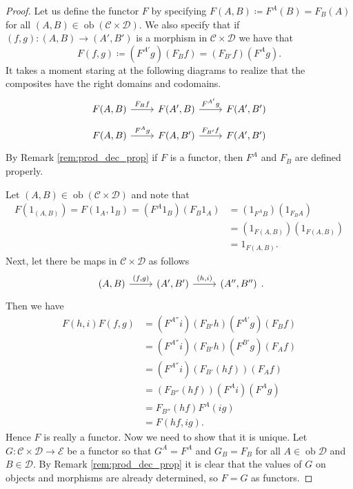 \documentclass{report}
\DeclareMathOperator{\ob}{ob}
\theoremstyle{definition}
\theoremstyle{plain}
\theoremstyle{definition}
\begin{document}
		\begin{proof}
			Let us define the functor $F$ by specifying $F(A,B) \coloneqq F^A(B) = F_B(A)$ for all $(A,B)\in\ob(\mathcal{C}\times\mathcal{D})$. We also specify that if $(f,g)\colon (A,B)\to (A',B')$ is a morphism in $\mathcal{C}\times \mathcal{D}$ we have that 
			\[
				F(f,g) \coloneqq (F^{A'}g)(F_Bf) = (F_{B'}f)(F^Ag).
			\]
			It takes a moment staring at the following diagrams to realize that the composites have the right domains and codomains.
			\[\begin{tikzcd}
				{F(A,B)} & {F(A',B)} & {F(A',B')}
				\arrow["{F_Bf}", from=1-1, to=1-2]
				\arrow["{F^{A'}g}", from=1-2, to=1-3]
			\end{tikzcd}\]
			\[\begin{tikzcd}
				{F(A,B)} & {F(A,B')} & {F(A',B')}
				\arrow["{F^Ag}", from=1-1, to=1-2]
				\arrow["{F_{B'}f}", from=1-2, to=1-3]
			\end{tikzcd}\]
			By Remark \ref{rem:prod_dec_prop} if $F$ is a functor, then $F^A$ and $F_B$ are defined properly. 
			
			Let $(A,B)\in\ob(\mathcal{C}\times\mathcal{D})$ and note that
			\begin{align*}
				F(1_{(A,B)}) = F(1_A,1_B) = (F^A1_B)(F_B1_A) &= (1_{F^AB})(1_{F_BA}) \\
				&= (1_{F(A,B)})(1_{F(A,B)})\\
				&= 1_{F(A,B)}.
			\end{align*}
			Next, let there be maps in $\mathcal{C}\times\mathcal{D}$ as follows
			\[\begin{tikzcd}
				{(A,B)} & {(A',B')} & {(A'',B'')}
				\arrow["{(f,g)}", from=1-1, to=1-2]
				\arrow["{(h,i)}", from=1-2, to=1-3]
			\end{tikzcd}.\]
			Then we have
			\begin{align*}
				F(h,i)F(f,g) &= (F^{A''}i)(F_{B'}h)(F^{A'}g)(F_Bf)\\
				&=(F^{A''}i)(F_{B'}h)(F^{B'}g)(F_Af)\\
				&= (F^{A''}i)(F_{B'}(hf))(F_Af)\\
				&= (F_{B''}(hf))(F^Ai)(F^Ag)\\
				&= F_{B''}(hf)F^A(ig)\\
				&= F(hf,ig).
			\end{align*}
			Hence $F$ is really a functor. Now we need to show that it is unique. Let $G\colon \mathcal{C}\times\mathcal{D}\to\mathcal{E}$ be a functor so that $G^A = F^A$ and $G_B = F_B$ for all $A\in\ob\mathcal{D}$ and $B\in\mathcal{D}$. By Remark \ref{rem:prod_dec_prop} it is clear that the values of $G$ on objects and morphisms are already determined, so $F =G$ as functors.
		\end{proof}
\end{document}
